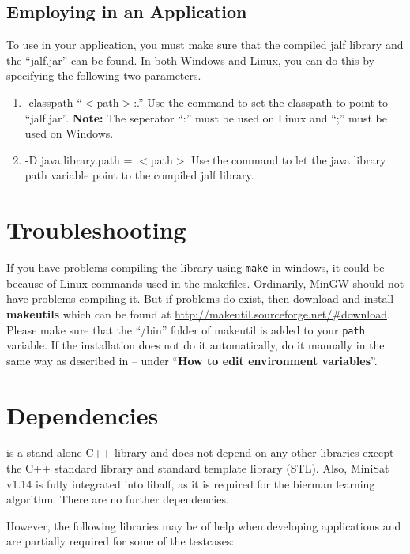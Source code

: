 \subsection*{Employing \libalf in an Application}
To use \libalf in your application, you must make sure that the compiled jalf library and the ``jalf.jar'' can be found. \vskip 1pt
In both Windows and Linux, you can do this by specifying the following two parameters.
\begin{enumerate}
 \item -classpath ``$<$path$>$:.'' \vskip 1pt
	Use the command to set the classpath to point to ``jalf.jar''. \vskip 1pt
	\textbf{Note:} The seperator ``:'' must be used on Linux and ``;'' must be used on Windows.
 \item -D java.library.path = $<$path$>$ \vskip 1pt
	Use the command to let the java library path variable point to the compiled jalf library. 
\end{enumerate}

\section{Troubleshooting}
If you have problems compiling the library using \texttt{make} in windows, it could be because of Linux commands used in the makefiles. Ordinarily, MinGW should not have problems compiling it. But if problems do exist, then download and install \textbf{makeutils} which can be found at \url{http://makeutil.sourceforge.net/#download}. \vskip 1pt
Please make sure that the ``/bin'' folder of makeutil is added to your \texttt{path} variable. If the installation does not do it automatically, do it manually in the same way as described in -- under ``\textbf{How to edit environment variables}''.

\section{Dependencies}
\libalf is a stand-alone C++ library and does not depend on any other libraries except the C++ standard library and standard template library (STL). Also, MiniSat v1.14 is fully integrated into libalf, as it is required for the bierman learning algorithm. There are no further dependencies.

However, the following libraries may be of help when developing applications and are partially required for some of the testcases:


